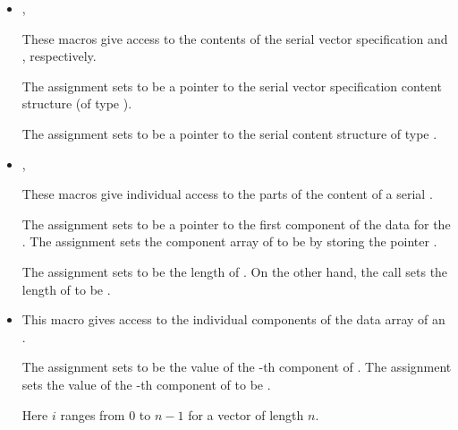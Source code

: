 \begin{itemize}

\item {}, 

      These macros give access to the contents of the serial 
      vector specification and , respectively.           
                                                               
      The assignment  sets       
       to be a pointer to the serial vector
      specification content structure (of type ).

      The assignment  sets       
       to be a pointer to the serial  content    
      structure of type .

\item {}, 

      These macros give individual access to the parts of    
      the content of a serial .                        
                                                               
      The assignment  sets  to be     
      a pointer to the first component of the data for the  . 
      The assignment  sets the component array of  to     
      be  by storing the pointer .                   
                                                               
      The assignment  sets  to be     
      the length of . On the other hand, the call  
      sets the length of  to be .

\item {}

      This macro gives access to the individual components of the data
      array of an .

      The assignment  sets  to be the value of 
      the -th component of . The assignment    
      sets the value of the -th component of  to be .        

      Here $i$ ranges from $0$ to $n-1$ for a vector of length $n$.


\end{itemize}
